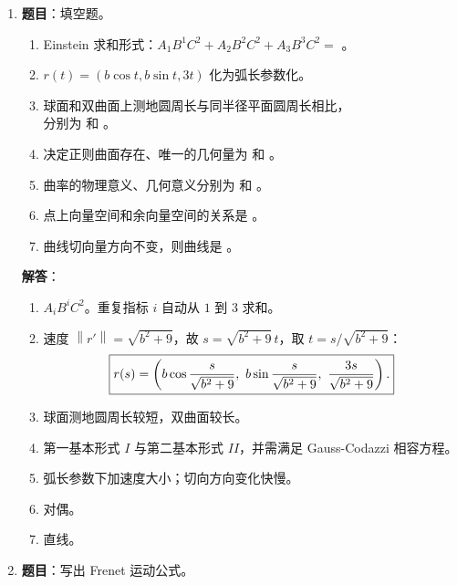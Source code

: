 \documentclass[UTF8,12pt,a4paper]{ctexart}
\newcommand{\norm}[1]{\left\lVert #1\right\rVert}
\begin{document}
\begin{enumerate}
\item \textbf{题目}：填空题。
\begin{enumerate}
\item Einstein 求和形式：$A_1B^1C^2+A_2B^2C^2+A_3B^3C^2=$ \underline{\hspace{3cm}}。
\item $r(t)=(b\cos t,b\sin t,3t)$ 化为弧长参数化。
\item 球面和双曲面上测地圆周长与同半径平面圆周长相比，\\
分别为 \underline{\hspace{2cm}} 和 \underline{\hspace{2cm}}。
\item 决定正则曲面存在、唯一的几何量为 \underline{\hspace{2cm}} 和 \underline{\hspace{2cm}}。
\item 曲率的物理意义、几何意义分别为 \underline{\hspace{3cm}} 和 \underline{\hspace{3cm}}。
\item 点上向量空间和余向量空间的关系是 \underline{\hspace{3cm}}。
\item 曲线切向量方向不变，则曲线是 \underline{\hspace{2cm}}。
\end{enumerate}

\textbf{解答}：
\begin{enumerate}
\item $\boxed{A_iB^iC^2}$。重复指标 $i$ 自动从 $1$ 到 $3$ 求和。
\item 速度 $\norm{r'}=\sqrt{b^2+9}$，故 $s=\sqrt{b^2+9}\,t$，取 $t=s/\sqrt{b^2+9}$：
\[
\boxed{r(s)=\left(b\cos{s\over\sqrt{b^2+9}},\ b\sin{s\over\sqrt{b^2+9}},\ {3s\over\sqrt{b^2+9}}\right).}
\]
\item 球面测地圆周长较短，双曲面较长。
\item 第一基本形式 $I$ 与第二基本形式 $II$，并需满足 Gauss-Codazzi 相容方程。
\item 弧长参数下加速度大小；切向方向变化快慢。
\item 对偶。
\item 直线。
\end{enumerate}

\item \textbf{题目}：写出 Frenet 运动公式。


\end{enumerate}
\end{document}
